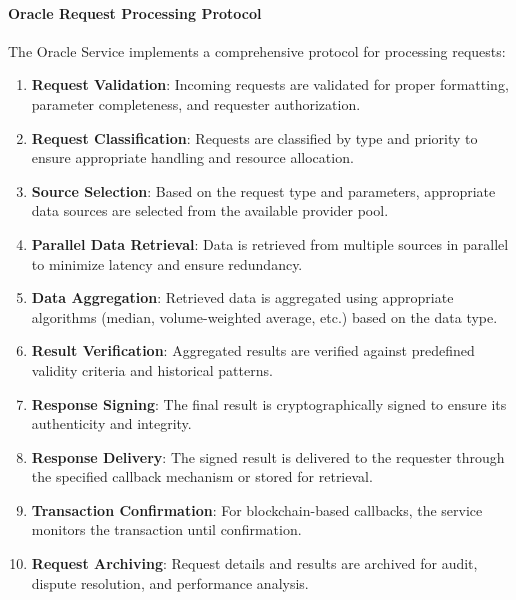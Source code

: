 \documentclass{article}
\begin{document}
\paragraph{Oracle Request Processing Protocol}
The Oracle Service implements a comprehensive protocol for processing requests:

\begin{enumerate}
    \item \textbf{Request Validation}: Incoming requests are validated for proper formatting, parameter completeness, and requester authorization.
    
    \item \textbf{Request Classification}: Requests are classified by type and priority to ensure appropriate handling and resource allocation.
    
    \item \textbf{Source Selection}: Based on the request type and parameters, appropriate data sources are selected from the available provider pool.
    
    \item \textbf{Parallel Data Retrieval}: Data is retrieved from multiple sources in parallel to minimize latency and ensure redundancy.
    
    \item \textbf{Data Aggregation}: Retrieved data is aggregated using appropriate algorithms (median, volume-weighted average, etc.) based on the data type.
    
    \item \textbf{Result Verification}: Aggregated results are verified against predefined validity criteria and historical patterns.
    
    \item \textbf{Response Signing}: The final result is cryptographically signed to ensure its authenticity and integrity.
    
    \item \textbf{Response Delivery}: The signed result is delivered to the requester through the specified callback mechanism or stored for retrieval.
    
    \item \textbf{Transaction Confirmation}: For blockchain-based callbacks, the service monitors the transaction until confirmation.
    
    \item \textbf{Request Archiving}: Request details and results are archived for audit, dispute resolution, and performance analysis.
\end{enumerate}
\end{document}
